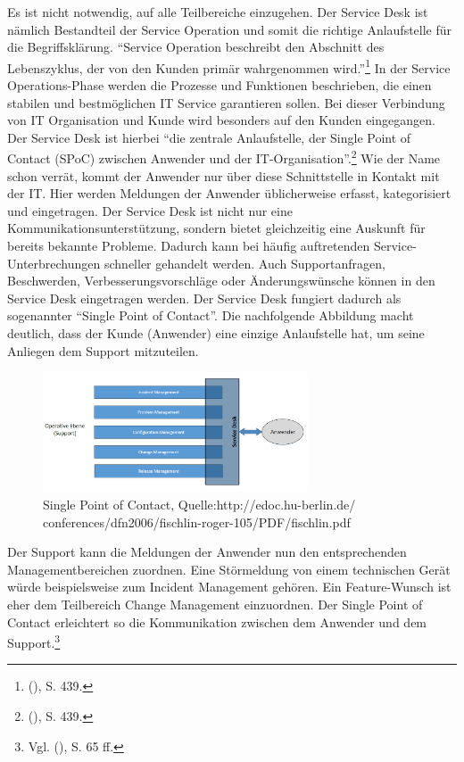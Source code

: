 \noindent
Es ist nicht notwendig, auf alle Teilbereiche einzugehen. Der Service Desk ist nämlich Bestandteil der Service Operation und somit die richtige Anlaufstelle für die Begriffsklärung. \newline \enquote{Service Operation beschreibt den Abschnitt des Lebenszyklus, der von den Kunden primär wahrgenommen wird.}\footnote{\citeauthor{Ebel} (\citeyear{Ebel}), S. 439.} In der Service Operations-Phase werden die Prozesse und Funktionen beschrieben, die einen stabilen  und bestmöglichen IT Service garantieren sollen. Bei dieser Verbindung von IT Organisation und Kunde wird besonders auf den Kunden eingegangen. Der Service Desk ist hierbei \enquote{die zentrale Anlaufstelle, der Single Point of Contact (SPoC) zwischen Anwender und der IT-Organisation}.\footnote{\citeauthor{Ebel} (\citeyear{Ebel}), S. 439.} Wie der Name schon verrät, kommt der Anwender nur über diese Schnittstelle in Kontakt mit der IT. Hier werden Meldungen der Anwender üblicherweise erfasst, kategorisiert und eingetragen. Der Service Desk ist nicht nur eine Kommunikationsunterstützung, sondern bietet gleichzeitig eine Auskunft für bereits bekannte Probleme. Dadurch kann bei häufig auftretenden Service-Unterbrechungen schneller gehandelt werden. Auch Supportanfragen, Beschwerden, Verbesserungsvorschläge oder Änderungswünsche können in den Service Desk eingetragen werden. Der Service Desk fungiert dadurch als sogenannter \enquote{Single Point of Contact}. Die nachfolgende Abbildung macht deutlich, dass der Kunde (Anwender) eine einzige Anlaufstelle hat, um seine Anliegen dem Support mitzuteilen. 

\begin{figure}[h!]
\centering
	\includegraphics[width=0.70\textwidth]{Abbildungen/SPOC_4.png}
	\caption[Single Point of Contact]{Single Point of Contact, Quelle:http://edoc.hu-berlin.de/
	conferences/dfn2006/fischlin-roger-105/PDF/fischlin.pdf}
	\label{fig:ITIL_Single_Point_of_Contact}
\end{figure}

\noindent
Der Support kann die Meldungen der Anwender nun den entsprechenden Managementbereichen zuordnen. Eine Störmeldung von einem technischen Gerät würde beispielsweise zum Incident Management gehören. Ein Feature-Wunsch ist eher dem Teilbereich Change Management einzuordnen. Der Single Point of Contact  erleichtert so die Kommunikation zwischen dem Anwender und dem Support.\footnote{Vgl. \citeauthor{Ebel} (\citeyear{Ebel}), S. 65 ff.}\\ 


